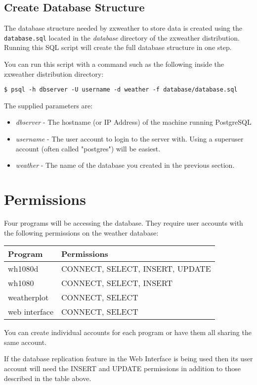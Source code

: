 \documentclass[a4paper,10pt,draft]{book}
\begin{document}
\subsection{Create Database Structure}
The database structure needed by zxweather to store data is created using the \verb|database.sql| located in the \emph{database} directory of the zxweather distribution. Running this SQL script will create the full database structure in one step.

You can run this script with a command such as the following inside the zxweather distribution directory:
\begin{verbatim}
$ psql -h dbserver -U username -d weather -f database/database.sql 
\end{verbatim}
The supplied parameters are:
\begin{itemize}
\item \emph{dbserver} - The hostname (or IP Address) of the machine running PostgreSQL
\item \emph{username} - The user account to login to the server with. Using a superuser account (often called "postgres") will be easiest.
\item \emph{weather} - The name of the database you created in the previous section.
\end{itemize}

\section{Permissions}
Four programs will be accessing the database. They require user accounts with the following permissions on the weather database:

\begin{tabular}{l l}
\hline
\textbf{Program} & \textbf{Permissions} \\
\hline
wh1080d & CONNECT, SELECT, INSERT, UPDATE \\
wh1080 & CONNECT, SELECT, INSERT \\
weatherplot & CONNECT, SELECT \\
web interface & CONNECT, SELECT \\
\hline
\end{tabular}

You can create individual accounts for each program or have them all sharing the same account.

If the database replication feature in the Web Interface is being used then its user account will need the INSERT and UPDATE permissions in addition to those described in the table above.
\end{document}
